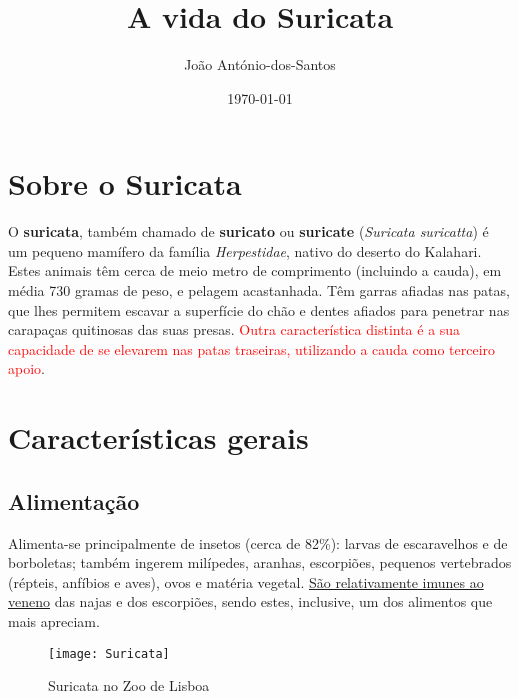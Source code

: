 \documentclass[a4paper,12pt]{article}
\title{A vida do Suricata}
\author{João António-dos-Santos}
\date{\today}
\begin{document}
\maketitle
\section{Sobre o Suricata}
O \textbf{suricata}, também chamado de \textbf{suricato} ou \textbf{suricate} (\textit{Suricata suricatta}) é um pequeno mamífero da família \textit{Herpestidae}, nativo do deserto do Kalahari. Estes animais têm cerca de meio metro de comprimento (incluindo a cauda), em média 730 gramas de peso, e pelagem acastanhada. Têm garras afiadas nas patas, que lhes permitem escavar a superfície do chão e dentes afiados para penetrar nas carapaças quitinosas das suas presas. \textcolor{red}{Outra característica distinta é a sua capacidade de se elevarem nas patas traseiras, utilizando a cauda como terceiro apoio}.
\section{Características gerais}
\subsection{Alimentação}
Alimenta-se principalmente de insetos (cerca de 82\%): larvas de escaravelhos e de borboletas; também ingerem milípedes, aranhas, escorpiões, pequenos vertebrados (répteis, anfíbios e aves), ovos e matéria vegetal. \uline{São relativamente imunes ao veneno} das najas e dos escorpiões, sendo estes, inclusive, um dos alimentos que mais apreciam.
\begin{figure}
\caption{Suricata no Zoo de Lisboa}
\centering
\texttt{[image: Suricata]}
\end{figure}
\end{document}
